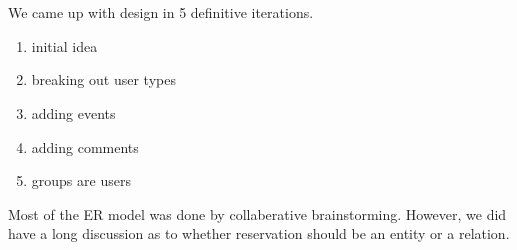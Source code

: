 \documentclass{article}
\begin{document}
\section{}
We came up with design in 5 definitive iterations. 
\begin{enumerate}
\item initial idea
\item breaking out user types
\item adding events
\item adding comments
\item groups are users
\end{enumerate}

Most of the ER model was done by collaberative brainstorming. However, we did
have a long discussion as to whether reservation should be an entity or a
relation.  


\section{}



\section{}

\end{document}
